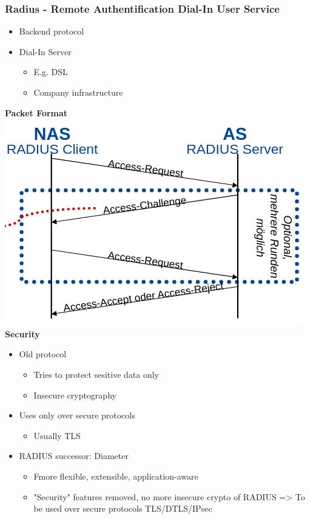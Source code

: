 \subsubsection{Radius - Remote Authentification Dial-In User Service}
\begin{itemize}
  \item Backend protocol
  \item Dial-In Server
    \begin{itemize}
      \item E.g. DSL
      \item Company infrastructure
    \end{itemize}
\end{itemize}
\textbf{Packet Format}\\
\includegraphics[width=0.7\columnwidth]{Resources/radius.png}
\textbf{Security}\\
\begin{itemize}
  \item Old protocol
    \begin{itemize}
      \item Tries to protect sesitive data only
      \item Insecure cryptography
    \end{itemize}
  \item Uses only over secure protocols
    \begin{itemize}
      \item Usually TLS
    \end{itemize}
  \item RADIUS successor: Diameter
    \begin{itemize}
      \item Fmore flexible, extensible, application-aware
      \item "Security" features removed, no more insecure crypto of RADIUS
        => To be used over secure protocols TLS/DTLS/IPsec
    \end{itemize}
\end{itemize}

